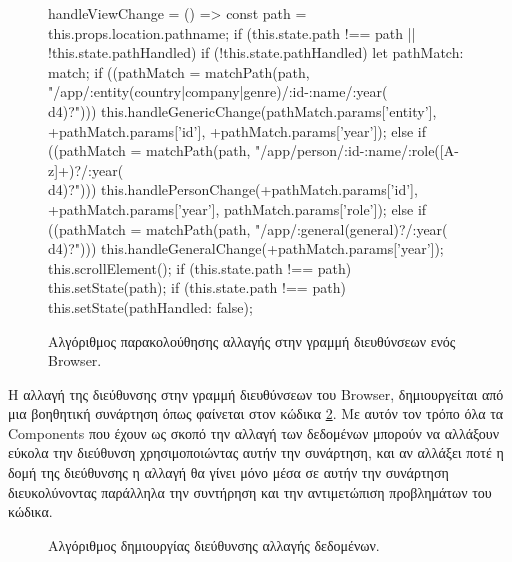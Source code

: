 \begin{figure}[h]
    \begin{TypeScriptcode}
handleViewChange = () => {
    const path = this.props.location.pathname;
    if (this.state.path !== path || !this.state.pathHandled) {
      if (!this.state.pathHandled) {
        let pathMatch: match;
        if ((pathMatch = matchPath(path, "/app/:entity(country|company|genre)/:id-:name/:year(\\d{4})?"))) {
          this.handleGenericChange(pathMatch.params['entity'], +pathMatch.params['id'], +pathMatch.params['year']);
        } else if ((pathMatch = matchPath(path, "/app/person/:id-:name/:role([A-z]+)?/:year(\\d{4})?"))) {
          this.handlePersonChange(+pathMatch.params['id'], +pathMatch.params['year'], pathMatch.params['role']);
        } else if ((pathMatch = matchPath(path, "/app/:general(general)?/:year(\\d{4})?"))) {
          this.handleGeneralChange(+pathMatch.params['year']);
        }
        this.scrollElement();
        if (this.state.path !== path)
          this.setState({path});
      }
      if (this.state.path !== path) {
        this.setState({pathHandled: false});
      }
    }
}
    \end{TypeScriptcode}
    \caption{Αλγόριθμος παρακολούθησης αλλαγής στην γραμμή διευθύνσεων ενός Browser.}
   \label{code:urlIntercept}
\end{figure}

Η αλλαγή της διεύθυνσης στην γραμμή διευθύνσεων του Browser, δημιουργείται από μια βοηθητική συνάρτηση όπως φαίνεται στον κώδικα \ref{code:urlBuilder}. Με αυτόν τον τρόπο όλα τα Components που έχουν ως σκοπό την αλλαγή των δεδομένων μπορούν να αλλάξουν εύκολα την διεύθυνση χρησιμοποιώντας αυτήν την συνάρτηση, και αν αλλάξει ποτέ η δομή της διεύθυνσης η αλλαγή θα γίνει μόνο μέσα σε αυτήν την συνάρτηση διευκολύνοντας παράλληλα την συντήρηση και την αντιμετώπιση προβλημάτων του κώδικα.

\begin{figure}[h]
    \caption{Αλγόριθμος δημιουργίας διεύθυνσης αλλαγής δεδομένων.}
   \label{code:urlBuilder}
\end{figure}

